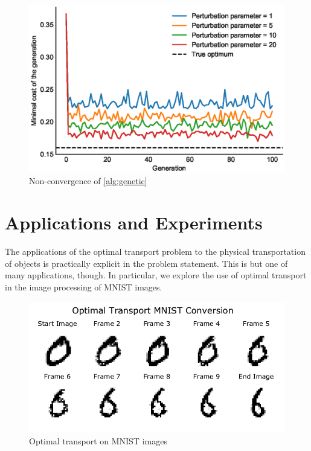 \documentclass{article}
\theoremstyle{definition}
\theoremstyle{remark}
\begin{document}
\begin{figure}[tb]
  \centering
  \includegraphics{figs/genetic.eps}
  \caption{Non-convergence of \cref{alg:genetic}}
  \label{fig:genetic_fail}
\end{figure}




\section{Applications and Experiments} %
\label{sec:applications_}

The applications of the optimal transport problem to the physical transportation
of objects is practically explicit in the problem statement. This is but one of
many applications, though. In particular, we explore the use of optimal
transport in the image processing of MNIST images.

\begin{figure}[tb]
  \centering
  \includegraphics{../../code/ot-mnist-evol.pdf}
  \caption{Optimal transport on MNIST images}
  \label{fig:mnisttransport}
\end{figure}
\end{document}
